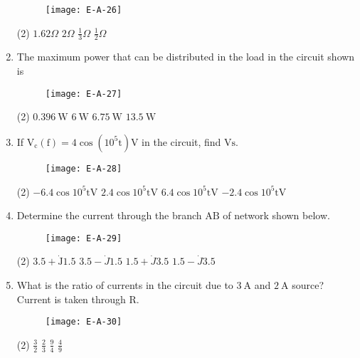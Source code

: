 \begin{enumerate}
\begin{figure}[H]
	\centering
	\texttt{[image: E-A-26]}
	\caption{}
	\label{}
\end{figure}
 \begin{tasks}(2)
	\task[\textbf{a.}]$1.62 \Omega$
	\task[\textbf{b.}]$2 \Omega$
	\task[\textbf{c.}]$\frac{1}{3} \Omega$
	\task[\textbf{d.}]$\frac{1}{2} \Omega$
\end{tasks}
\item The maximum power that can be distributed in the load in the circuit shown is
\begin{figure}[H]
	\centering
	\texttt{[image: E-A-27]}
	\caption{}
	\label{}
\end{figure}
 \begin{tasks}(2)
	\task[\textbf{a.}]$0.396 \mathrm{~W}$
	\task[\textbf{b.}]$6 \mathrm{~W}$
	\task[\textbf{c.}]$6.75 \mathrm{~W}$
	\task[\textbf{d.}]$13.5 \mathrm{~W}$ 
\end{tasks}
\item If $\mathrm{V}_{\mathrm{c}}(\mathrm{f})=4 \cos \left(10^{5} \mathrm{t}\right) \mathrm{V}$ in the circuit, find $\mathrm{Vs}$.
\begin{figure}[H]
	\centering
	\texttt{[image: E-A-28]}
	\caption{}
	\label{}
\end{figure}
 \begin{tasks}(2)
	\task[\textbf{a.}]$-6.4 \cos 10^{5} \mathrm{t} \mathrm{V}$
	\task[\textbf{b.}]$2.4 \cos 10^{5} \mathrm{t} \mathrm{V}$
	\task[\textbf{c.}]$6.4 \cos 10^{5} \mathrm{t} \mathrm{V}$
	\task[\textbf{d.}]$-2.4 \cos 10^{5} \mathrm{t} \mathrm{V}$ 
\end{tasks}
\item Determine the current through the branch $\mathrm{AB}$ of network shown below.
\begin{figure}[H]
	\centering
	\texttt{[image: E-A-29]}
	\caption{}
	\label{}
\end{figure}
 \begin{tasks}(2)
	\task[\textbf{a.}]$3.5+\dot{\mathrm{J}} 1.5$
	\task[\textbf{b.}]$3.5-\dot{J} 1.5$
	\task[\textbf{c.}]$1.5+\dot{J} 3.5$
	\task[\textbf{d.}]$1.5-\dot{J} 3.5$ 
\end{tasks}
\item What is the ratio of currents in the circuit due to $3 \mathrm{~A}$ and $2 \mathrm{~A}$ source? Current is taken through $\mathrm{R}$.
\begin{figure}[H]
	\centering
	\texttt{[image: E-A-30]}
	\caption{}
	\label{}
\end{figure}
 \begin{tasks}(2)
	\task[\textbf{a.}]$\frac{3}{2}$
	\task[\textbf{b.}]$\frac{2}{3}$
	\task[\textbf{c.}]$\frac{9}{4}$
	\task[\textbf{d.}] $\frac{4}{9}$ 
\end{tasks}
\end{enumerate}
